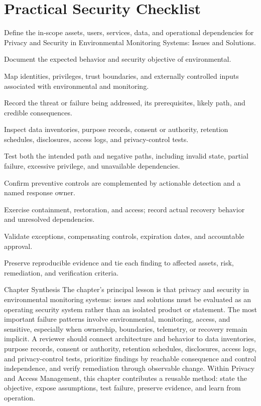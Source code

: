 \documentclass[11pt,letterpaper]{article}
\begin{document}
\section*{Practical Security Checklist}
\begin{CornellChecklist}
\item Define the in-scope assets, users, services, data, and operational dependencies for Privacy and Security in Environmental Monitoring Systems: Issues and Solutions.
\item Document the expected behavior and security objective of environmental.
\item Map identities, privileges, trust boundaries, and externally controlled inputs associated with environmental and monitoring.
\item Record the threat or failure being addressed, its prerequisites, likely path, and credible consequences.
\item Inspect data inventories, purpose records, consent or authority, retention schedules, disclosures, access logs, and privacy-control tests.
\item Test both the intended path and negative paths, including invalid state, partial failure, excessive privilege, and unavailable dependencies.
\item Confirm preventive controls are complemented by actionable detection and a named response owner.
\item Exercise containment, restoration, and access; record actual recovery behavior and unresolved dependencies.
\item Validate exceptions, compensating controls, expiration dates, and accountable approval.
\item Preserve reproducible evidence and tie each finding to affected assets, risk, remediation, and verification criteria.
\end{CornellChecklist}
\begin{CornellSummaryBox}{Chapter Synthesis}
The chapter's principal lesson is that privacy and security in environmental monitoring systems: issues and solutions must be evaluated as an operating security system rather than an isolated product or statement. The most important failure patterns involve environmental, monitoring, access, and sensitive, especially when ownership, boundaries, telemetry, or recovery remain implicit. A reviewer should connect architecture and behavior to data inventories, purpose records, consent or authority, retention schedules, disclosures, access logs, and privacy-control tests, prioritize findings by reachable consequence and control independence, and verify remediation through observable change. Within Privacy and Access Management, this chapter contributes a reusable method: state the objective, expose assumptions, test failure, preserve evidence, and learn from operation.
\end{CornellSummaryBox}
\end{document}
